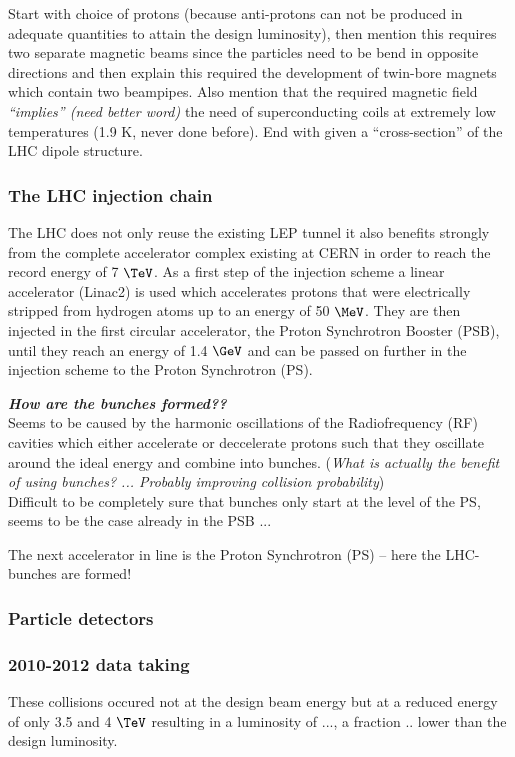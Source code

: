 Start with choice of protons (because anti-protons can not be produced in adequate quantities to attain the design luminosity), then mention this requires two separate magnetic beams since the particles need to be bend in opposite directions and then explain this required the development of twin-bore magnets which contain two beampipes. Also mention that the required magnetic field \textit{``implies'' (need better word)} the need of superconducting coils at extremely low temperatures (1.9 K, never done before). End with given a ``cross-section'' of the LHC dipole structure.

\subsubsection{The LHC injection chain}
The LHC does not only reuse the existing LEP tunnel it also benefits strongly from the complete accelerator complex existing at CERN in order to reach the record energy of 7 $\TeV$. As a first step of the injection scheme a linear accelerator (Linac2) is used which accelerates protons that were electrically stripped from hydrogen atoms up to an energy of 50 $\MeV$. They are then injected in the first circular accelerator, the Proton Synchrotron Booster (PSB), until they reach an energy of 1.4 $\GeV$ and can be passed on further in the injection scheme to the Proton Synchrotron (PS). 

\textbf{\textit{How are the bunches formed??}} \\
Seems to be caused by the harmonic oscillations of the Radiofrequency (RF) cavities which either accelerate or deccelerate protons such that they oscillate around the ideal energy and combine into bunches. (\textit{What is actually the benefit of using bunches? ... Probably improving collision probability})\\
Difficult to be completely sure that bunches only start at the level of the PS, seems to be the case already in the PSB ...

The next accelerator in line is the Proton Synchrotron (PS) -- here the LHC-bunches are formed!

\subsubsection{Particle detectors}

\subsubsection{2010-2012 data taking}
These collisions occured not at the design beam energy but at a reduced energy of only 3.5 and 4 $\TeV$ resulting in a luminosity of ..., a fraction .. lower than the design luminosity.

